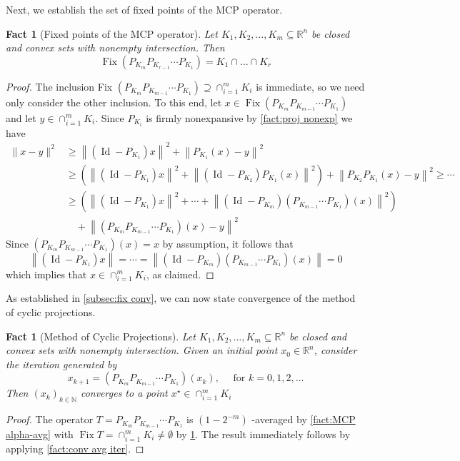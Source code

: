 \documentclass[smallextended,numbook,nospthms]{svjour3}
\theoremstyle{plain}
\newtheorem{fact}[theorem]{Fact}
\theoremstyle{definition}
\def\RR{\mathds R}
\def\NN{\mathds N}
\DeclareMathOperator{\Id}{Id}
\DeclareMathOperator{\Fix}{Fix}
\begin{document}
Next, we establish the set of fixed points of the MCP operator.
\begin{fact}[Fixed points of the MCP operator]\label{fact:MCP Fix}
	Let $K_{1}, K_{2}, \ldots, K_{m} \subseteq \RR^n$ be closed and convex sets with nonempty intersection. Then
	$$
	\Fix\left(P_{K_{m}} P_{K_{r-1}} \cdots P_{K_{1}}\right)=K_{1} \cap \ldots \cap K_{r}
	$$
\end{fact}
\begin{proof}
	The inclusion Fix $\left(P_{K_{m}} P_{K_{m-1}} \cdots P_{K_{1}}\right) \supseteq \cap_{i=1}^{m} K_{i}$ is immediate, so we need only consider the other inclusion. To this end, let $x \in \Fix \left(P_{K_{m}} P_{K_{m-1}} \cdots P_{K_{1}}\right)$ and let $y \in \cap_{i=1}^{m} K_{i}$. Since $P_{K_{i}}$ is firmly nonexpansive by \cref{fact:proj nonexp} we have
	\begin{align}
		\|x-y\|^{2} & \geq\left\|\left(\Id-P_{K_{1}}\right) x\right\|^{2}+\left\|P_{K_{1}}(x)-y\right\|^{2} \\
		& \geq\left(\left\|\left(\Id-P_{K_{1}}\right) x\right\|^{2}+\left\|\left(\Id-P_{K_{2}}\right) P_{K_{1}}(x)\right\|^{2}\right)+\left\|P_{K_{2}} P_{K_{1}}(x)-y\right\|^{2} \geq \cdots \\
		& \geq\left(\left\|\left(\Id-P_{K_{1}}\right) x\right\|^{2}+\cdots+\left\|\left(\Id-P_{K_{m}}\right)\left(P_{K_{m-1}} \cdots P_{K_{1}}\right)(x)\right\|^{2}\right) \\
		&\quad+\left\|\left(P_{K_{m}} P_{K_{m-1}} \cdots P_{K_{1}}\right)(x)-y\right\|^{2}
	\end{align}
	Since $\left(P_{K_{m}} P_{K_{m-1}} \cdots P_{K_{1}}\right)(x)=x$ by assumption, it follows that
	$$
	\left\|\left(\Id-P_{K_{1}}\right) x\right\|=\cdots=\left\|\left(\Id-P_{K_{m}}\right)\left(P_{K_{m-1}} \cdots P_{K_{1}}\right)(x)\right\|=0
	$$
	which implies that $x \in \cap_{i=1}^{m} K_{i}$, as claimed.
\end{proof}

As established in \cref{subsec:fix conv}, we can now state convergence of the method of cyclic projections.
\begin{fact}[Method of Cyclic Projections]\label{fact:MCP conv}
	Let $K_{1}, K_{2}, \ldots, K_{m} \subseteq \RR^n$ be closed and convex sets with nonempty intersection. Given an initial point $x_{0} \in \RR^n$, consider the iteration generated by
	$$
	x_{k+1}=\left(P_{K_{m}} P_{K_{m-1}} \cdots P_{K_{1}}\right)\left(x_{k}\right), \quad \text { for } k=0,1,2, \ldots
	$$
	Then $\left(x_{k}\right)_{k \in \NN}$ converges to a point $x^{\star} \in \cap_{i=1}^{m} K_{i}$
\end{fact}
\begin{proof}
	The operator $T=P_{K_{m}} P_{K_{m-1}} \cdots P_{K_{1}}$ is $\left(1-2^{-m}\right)$ -averaged by \cref{fact:MCP alpha-avg} with $\Fix T=\cap_{i=1}^{m} K_{i} \neq \emptyset$ by \cref{fact:MCP Fix}. The result immediately follows by applying \cref{fact:conv avg iter}.
\end{proof}
\end{document}
